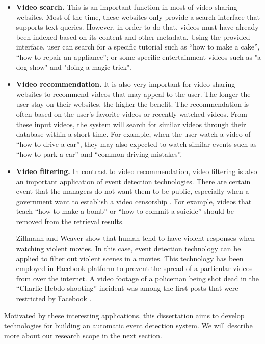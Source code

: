 \begin{itemize}
	\item \textbf{Video search.} This is an important function in most of video sharing websites. Most of the time, these websites only provide a search interface that supports text queries. However, in order to do that, videos must have already been indexed based on its content and other metadata. Using the provided interface, user can search for a specific tutorial such as ``how to make a cake'',  ``how to repair an appliance''; or some specific entertainment videos such as "a dog show" and "doing a magic trick".
	\item \textbf{Video recommendation.} It is also very important for video sharing websites to recommend videos that may appeal to the user. The longer the user stay on their websites, the higher the benefit. The recommendation is often based on the user's favorite videos or recently watched videos. From these input videos, the system will search for similar videos through their database within a short time. For example, when the user watch a video of ``how to drive a car'', they may also expected to watch similar events such as ``how to park a car'' and ``common driving mistakes''.
	\item \textbf{Video filtering.} In contrast to video recommendation, video filtering is also an important application of event detection technologies. There are certain event that the managers do not want them to be public, especially when a government want to establish a video censorship . For example, videos that teach ``how to make a bomb'' or ``how to commit a suicide'' should be removed from the retrieval results. 

	Zillmann and Weaver \cite{JASP:JASP145} show that human tend to have violent responses when watching violent movies. In this case, event detection technology can be applied to filter out violent scenes  in a movies. This technology has been employed in Facebook platform \cite{Internet3} to prevent the spread of a particular videos from over the internet. A video footage of a policeman being shot dead in the ``Charlie Hebdo shooting'' incident was among the first posts that were restricted by Facebook \cite{Internet3}. 
	
\end{itemize}

Motivated by these interesting applications, this dissertation aims to develop technologies for building an automatic event detection system. We will describe more about our research scope in the next section.

